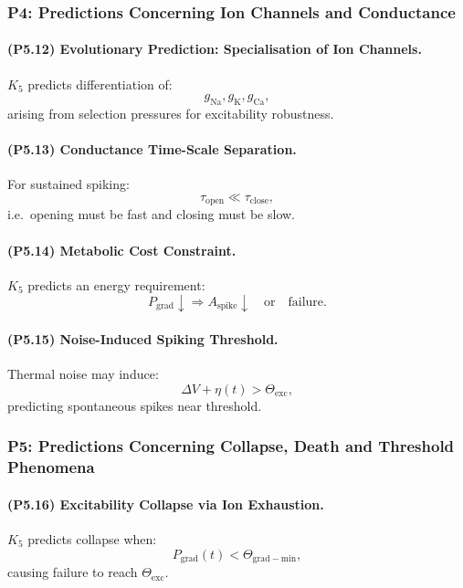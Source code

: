 \subsubsection{P4: Predictions Concerning Ion Channels and Conductance}

\paragraph{(P5.12) Evolutionary Prediction: Specialisation of Ion Channels.}
$K_5$ predicts differentiation of:
\[
g_{\mathrm{Na}}, g_{\mathrm{K}}, g_{\mathrm{Ca}},
\]
arising from selection pressures for excitability robustness.

\paragraph{(P5.13) Conductance Time-Scale Separation.}
For sustained spiking:
\[
\tau_{\mathrm{open}} \ll \tau_{\mathrm{close}},
\]
i.e.\ opening must be fast and closing must be slow.

\paragraph{(P5.14) Metabolic Cost Constraint.}
$K_5$ predicts an energy requirement:
\[
P_{\mathrm{grad}} \downarrow \Rightarrow 
A_{\mathrm{spike}} \downarrow \quad \text{or} \quad \text{failure}.
\]

\paragraph{(P5.15) Noise-Induced Spiking Threshold.}
Thermal noise may induce:
\[
\Delta V + \eta(t) > \Theta_{\mathrm{exc}},
\]
predicting spontaneous spikes near threshold.

\subsubsection{P5: Predictions Concerning Collapse, Death and Threshold Phenomena}

\paragraph{(P5.16) Excitability Collapse via Ion Exhaustion.}
$K_5$ predicts collapse when:
\[
P_{\mathrm{grad}}(t) < \Theta_{\mathrm{grad-min}},
\]
causing failure to reach $\Theta_{\mathrm{exc}}$.

